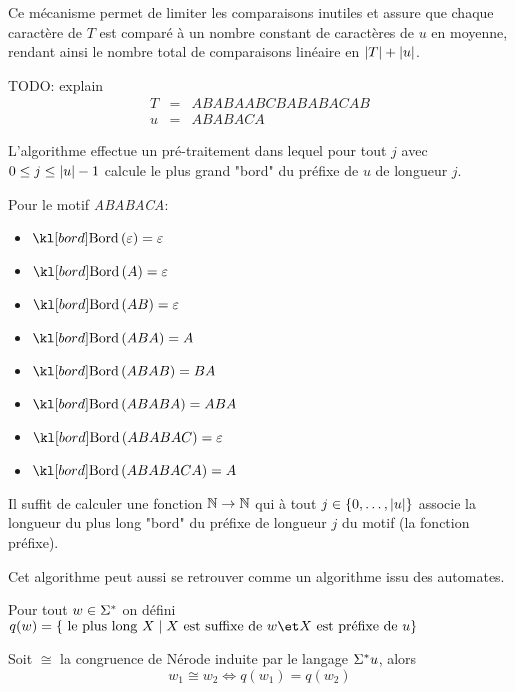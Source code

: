 Ce mécanisme permet de limiter les comparaisons inutiles et assure que chaque caractère de $T$
est comparé à un nombre constant de caractères de $u$ en moyenne, rendant ainsi le nombre total
de comparaisons linéaire en $|T| + |u|$.


\begin{exemple}
	TODO: explain
	\begin{eqnarray*}
		T &=& ABABAABCBABABACAB \\
		u &=& ABABACA
	\end{eqnarray*}
\end{exemple}


L'algorithme effectue un pré-traitement dans lequel pour tout $j$ avec $0 \leq j \leq |u| - 1$
calcule le plus grand "bord" du préfixe de $u$ de longueur $j$.

\begin{exemple}
	Pour le motif \emph{ABABACA}:

	\begin{itemize}
		\item $\Bord {\motvide} = \motvide$
		\item $\Bord A = \motvide$
		\item $\Bord {AB} = \motvide$
		\item $\Bord {ABA} = A$
		\item $\Bord {ABAB} = BA$
		\item $\Bord {ABABA} = ABA$
		\item $\Bord {ABABAC} = \motvide$
		\item $\Bord {ABABACA} = A$
	\end{itemize}
\end{exemple}

Il suffit de calculer une fonction $\mathbb{N} \to \mathbb{N}$ qui à tout $j \in \left\{0,\ldots,|u|\right\}$ associe
la longueur du plus long "bord" du préfixe de longueur $j$ du motif (la fonction préfixe).


Cet algorithme peut aussi se retrouver comme un algorithme issu des automates.


\begin{definition}
	Pour tout $w \in \Sigma^{*}$ on défini
	$q(w) = \setdef {\text{ le plus long } X} {X \text{ est suffixe de } w \et X \text{ est préfixe de } u}$
\end{definition}

\begin{prop}
	Soit $\cong$ la congruence de Nérode induite par le langage $\Sigma^{*} u$, alors
	$$ w_1 \cong w_2 \iff q(w_1) = q(w_2)$$
\end{prop}

